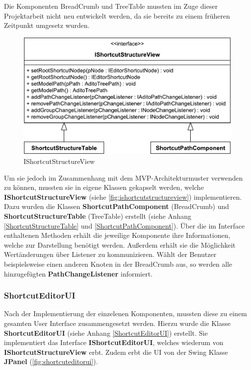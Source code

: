 Die Komponenten BreadCrumb und TreeTable mussten im Zuge dieser Projektarbeit nicht neu entwickelt werden, da sie bereits zu einem früheren Zeitpunkt umgesetz wurden. 

\begin{figure}
	\vspace{-12px}
	\centering
	\includegraphics[width=1\linewidth]{../graphic/diagrams/CD_IShortcutStructureView/IShortcutStructureView}
	\caption{IShortcutStructureView}
	\label{fig:ishortcutstructureview}
\end{figure}

Um sie jedoch im Zusammenhang mit dem MVP-Architekturmuster verwenden zu können, mussten sie in eigene Klassen gekapselt werden, welche \textbf{IShortcutStructureView} (siehe \autoref{fig:ishortcutstructureview}) implementieren. Dazu wurden die Klassen \textbf{ShortcutPathComponent} (BreadCrumb) und \textbf{ShortcutStructureTable} (TreeTable) erstellt (siehe Anhang \ref{ShortcutStructureTable} und \ref{ShortcutPathComponent}). Über die im Interface enthaltenen Methoden erhält die jeweilige Komponente ihre Informationen, welche zur Darstellung benötigt werden. Außerdem erhält sie die Möglichkeit Wertänderungen über Listener zu kommunizieren. Wählt der Benutzer beispielsweise einen anderen Knoten in der BreadCrumb aus, so werden alle hinzugefügten \textbf{PathChangeListener} informiert.


\subsubsection{ShortcutEditorUI}

Nach der Implementierung der einzelenen Komponenten, mussten diese zu einem gesamten User Interface zusammengesetzt werden. Hierzu wurde die Klasse \textbf{ShortcutEditorUI} (siehe Anhang \ref{ShortcutEditorUI}) erstellt. Sie implementiert das Interface \textbf{IShortcutEditorUI}, welches wiederum von \textbf{IShortcutStructureView} erbt. Zudem erbt die UI von der Swing Klasse \textbf{JPanel} (\autoref{fig:shortcuteditorui}).

